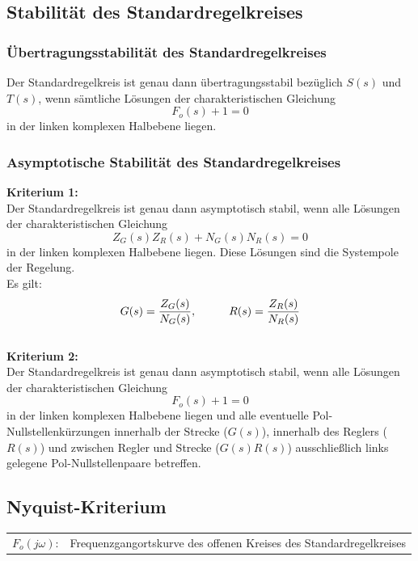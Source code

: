 \documentclass[10pt,a4paper]{article}
\renewcommand{\arraystretch}{1.5}
\newcommand{\tab}[1][1]{\hspace*{#1cm}}
\begin{document}
\subsection{Stabilität des Standardregelkreises}
\subsubsection{Übertragungsstabilität des Standardregelkreises}
Der Standardregelkreis ist genau dann übertragungsstabil bezüglich $S(s)$ und $T(s)$, wenn sämtliche Lösungen der charakteristischen Gleichung 
$$
	F_o(s) + 1 = 0
$$
in der linken komplexen Halbebene liegen.

\subsubsection{Asymptotische Stabilität des Standardregelkreises}
\textbf{Kriterium 1:} \\
Der Standardregelkreis ist genau dann asymptotisch stabil, wenn alle Lösungen der charakteristischen Gleichung 
$$
	Z_G(s)Z_R(s) + N_G(s)N_R(s) = 0
$$
in der linken  komplexen Halbebene liegen. Diese Lösungen sind die Systempole der Regelung. \\
Es gilt: 
$$
	G(s) = \frac{Z_G(s)}{N_G(s)}, \tab R(s) = \frac{Z_R(s)}{N_R(s)}
$$ \\

\textbf{Kriterium 2:} \\
Der Standardregelkreis ist genau dann asymptotisch stabil, wenn alle Lösungen der charakteristischen Gleichung
$$
	F_o(s) + 1 = 0
$$
in der linken komplexen Halbebene liegen und alle eventuelle Pol-Nullstellenkürzungen innerhalb der Strecke ($G(s)$), innerhalb des Reglers ($R(s)$) und zwischen Regler und Strecke ($G(s)R(s)$) ausschließlich links gelegene Pol-Nullstellenpaare betreffen.


\subsection{Nyquist-Kriterium}
\renewcommand{\arraystretch}{1}
\begin{tabular}{ll}
	$F_o(j \omega)$: & Frequenzgangortskurve des offenen Kreises des Standardregelkreises
\end{tabular}
\end{document}
